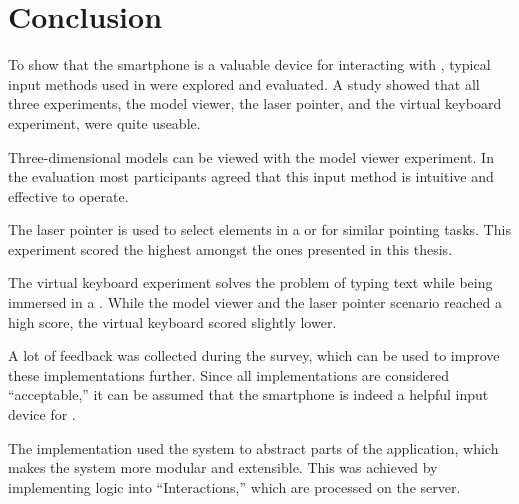 \chapter{Conclusion}\label{chapter:conclusion}

To show that the smartphone is a valuable device for interacting with , typical input methods used in  were explored and evaluated. A  study showed that all three experiments, the model viewer, the laser pointer, and the virtual keyboard experiment, were quite useable.

Three-dimensional models can be viewed with the model viewer experiment. In the evaluation most participants agreed that this input method is intuitive and effective to operate.

The laser pointer is used to select elements in a  or for similar pointing tasks. This experiment scored the highest amongst the ones presented in this thesis. 

The virtual keyboard experiment solves the problem of typing text while being immersed in a . While the model viewer and the laser pointer scenario reached a high score, the virtual keyboard scored slightly lower. 

A lot of feedback was collected during the survey, which can be used to improve these implementations further. Since all implementations are considered \enquote{acceptable,} it can be assumed that the smartphone is indeed a helpful input device for .

The implementation used the  system to abstract parts of the application, which makes the system more modular and extensible. This was achieved by implementing logic into \enquote{Interactions,} which are processed on the server. 